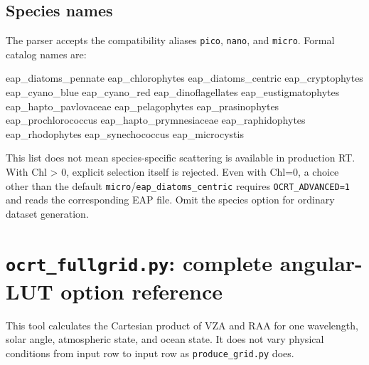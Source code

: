 \subsection{Species names}
\label{sec:auto:06_python_batch:5.1}
The parser accepts the compatibility aliases \texttt{pico}, \texttt{nano}, and \texttt{micro}. Formal catalog names are:


\begin{ManualCode}
eap_diatoms_pennate        eap_chlorophytes        eap_diatoms_centric
eap_cryptophytes           eap_cyano_blue         eap_cyano_red
eap_dinoflagellates        eap_eustigmatophytes   eap_hapto_pavlovaceae
eap_pelagophytes           eap_prasinophytes      eap_prochlorococcus
eap_hapto_prymnesiaceae     eap_raphidophytes      eap_rhodophytes
eap_synechococcus          eap_microcystis
\end{ManualCode}

This list does not mean species-specific scattering is available in production RT. With Chl > 0, explicit selection itself is rejected. Even with Chl=0, a choice other than the default \texttt{micro}/\texttt{eap\_\allowbreak{}diatoms\_\allowbreak{}centric} requires \texttt{OCRT\_\allowbreak{}ADVANCED=\allowbreak{}1} and reads the corresponding EAP file. Omit the species option for ordinary dataset generation.

\section{\texttt{ocrt\_\allowbreak{}fullgrid.\allowbreak{}py}: complete angular-LUT option reference}
\label{sec:auto:06_python_batch:6}
This tool calculates the Cartesian product of VZA and RAA for one wavelength, solar angle, atmospheric state, and ocean state. It does not vary physical conditions from input row to input row as \texttt{produce\_\allowbreak{}grid.\allowbreak{}py} does.


